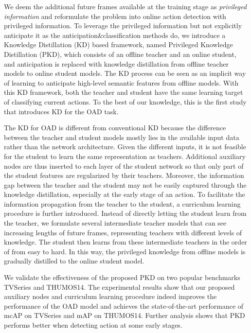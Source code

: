 \documentclass[final]{cvpr}
\begin{document}
We deem the additional future frames available at the training stage as \emph{privileged information}\cite{vapnik2009new, vapnik2015learning} and reformulate the problem into online action detection with privileged information. To leverage the privileged information but not explicitly anticipate it as the anticipation\&classification methods do, we introduce a Knowledge Distillation (KD) based framework, named Privileged Knowledge Distillation (PKD), 
which consists of an offline teacher and an online student, and anticipation is replaced with knowledge distillation from offline teacher models to online student models. The KD process can be seen as an implicit way of learning to anticipate high-level semantic features from offline models. With this KD framework, both the teacher and student have the same learning target of classifying current actions. To the best of our knowledge, this is the first study that introduces KD for the OAD task.


The KD for OAD is different from conventional KD because the difference between the teacher and student models mostly lies in the available input data rather than the network architecture. Given the different inputs, it is not feasible for the student to learn the same representation as teachers. Additional auxiliary nodes are thus inserted to each layer of the student network so that only part of the student features are regularized by their teachers.
Moreover, the information gap between the teacher and the student may not be easily captured through the knowledge distillation, especially at the early stage of an action.
To facilitate the information propagation from the teacher to the student, a curriculum learning procedure is further introduced. Instead of directly letting the student learn from the teacher, we formulate several intermediate teacher models that can see increasing lengths of future frames, representing teachers with different levels of knowledge. The student then learns from these intermediate teachers in the order of from easy to hard. In this way, the privileged knowledge from offline models is gradually distilled to the online student model.


We validate the effectiveness of the proposed PKD on two popular benchmarks TVSeries and THUMOS14. The experimental results show that our proposed auxiliary nodes and curriculum learning procedure indeed improves the performance of the OAD model and achieves the state-of-the-art performance of  mcAP on TVSeries and  mAP on THUMOS14. Further analysis shows that PKD performs better when detecting action at some early stages. 
\end{document}

